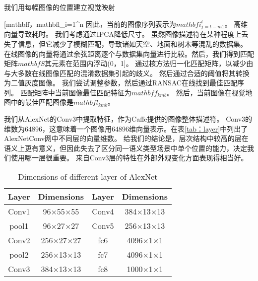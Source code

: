 我们用每幅图像的位置建立视觉映射{[mathbf{f}，mathbf{l}_{i=1}^{n} 因此，当前的图像序列表示为${mathbf{i}}_{j=t-m1}^{t}$。 高维向量导致耗时。 我们考虑通过IPCA降低尺寸。 虽然图像描述符在某种程度上丢失了信息，但它减少了模糊匹配，导致诸如天空、地面和树木等混乱的数据集。 在线图像的向量将通过余弦距离逐个与数据集向量进行比较。然后，我们得到匹配矩阵$mathbf{S}$其元素在范围内浮动(0，1]。 通过核方法归一化匹配矩阵，以减少由与大多数在线图像匹配的混淆数据集引起的歧义。 然后通过合适的阈值将其转换为二值灰度图像。 我们尝试调整参数，然后通过RANSAC在线找到最佳匹配序列。 匹配矩阵中当前图像最佳匹配特征为$mathbf{f}_{kmb}$。 然后，当前图像在视觉地图中的最佳匹配图像是$mathbf{l}_{kmb}$。

 我们从AlexNet的Conv3中提取特征，作为Caffe提供的图像整体描述符。 Conv3的维数为64896，这意味着一个图像用64896维向量表示。在表\ref{tab：layer}中列出了AlexNetConv网中不同层的向量维数\cite{krizhevsky2012imagenet}。 \cite{sunderhauf2015Performance}给我们的结论是，层次结构中较高的层在语义上更有意义，但因此失去了区分同一语义类型场景中单个位置的能力，决定我们使用哪一层很重要。 来自Conv3层的特性在外部外观变化方面表现得相当好。

\begin{table}[!htbp] 
    \caption{Dimensions of different layer of AlexNet } 
    \label{tab:layer}
    \begin{center} 
        \begin{tabular}{c c c c} 
              \toprule
             Layer & Dimensions & Layer & Dimensions\\
              \midrule 
             Conv1 & 96$\times$55$\times$55 & Conv4 & 384$\times$13$\times$13\\
             pool1 & 96$\times$27$\times$27 & Conv5 & 256$\times$13$\times$13\\
             Conv2 & 256$\times$27$\times$27 & fc6 & 4096$\times$1$\times$1\\
             pool2 & 256$\times$13$\times$13 & fc7 & 4096$\times$1$\times$1\\
             Conv3 & 384$\times$13$\times$13 & fc8 & 1000$\times$1$\times$1\\
             \bottomrule 
         \end{tabular} 
     \end{center} 
 \end{table}
}
